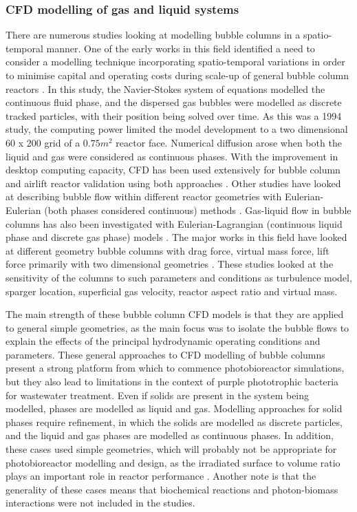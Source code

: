 \subsubsection{CFD modelling of gas and liquid systems}
There are numerous studies looking at modelling bubble columns in a spatio-temporal manner. One of the early works in this field identified a need to consider a modelling technique incorporating spatio-temporal variations in order to minimise capital and operating costs during scale-up of general bubble column reactors \cite{lapin1994}. In this study, the Navier-Stokes system of equations modelled the continuous fluid phase, and the dispersed gas bubbles were modelled as discrete tracked particles, with their position being solved over time. As this was a 1994 study, the computing power limited the model development to a two dimensional 60 x 200 grid of a $0.75 m^{2}$ reactor face. Numerical diffusion arose when both the liquid and gas were considered as continuous phases. With the improvement in desktop computing capacity, CFD has been used extensively for bubble column and airlift reactor validation using both approaches \cite{bitog2011}. Other studies have looked at describing bubble flow within different reactor geometries with Eulerian-Eulerian (both phases considered continuous) methods \cite{lehr2002, pfleger2001, buwa2002, pareek2003, ekambara2005, sokolichin1999}. Gas-liquid flow in bubble columns has also been investigated with Eulerian-Lagrangian (continuous liquid phase and discrete gas phase) models \cite{zhang2013a}. The major works in this field have looked at different geometry bubble columns with drag force, virtual mass force, lift force primarily with two dimensional geometries \cite{buwa2006, goz2004, luo2011, ekambara2005, mouza2004}. These studies looked at the sensitivity of the columns to such parameters and conditions as turbulence model, sparger location, superficial gas velocity, reactor aspect ratio and virtual mass.
\skippingparagraph

The main strength of these bubble column CFD models is that they are applied to general simple geometries, as the main focus was to isolate the bubble flows to explain the effects of the principal hydrodynamic operating conditions and parameters. These general approaches to CFD modelling of bubble columns present a strong platform from which to commence photobioreactor simulations, but they also lead to limitations in the context of purple phototrophic bacteria for wastewater treatment. Even if solids are present in the system being modelled, phases are modelled as liquid and gas. Modelling approaches for solid phases require refinement, in which the solids are modelled as discrete particles, and the liquid and gas phases are modelled as continuous phases. In addition, these cases used simple geometries, which will probably not be appropriate for photobioreactor modelling and design, as the irradiated surface to volume ratio plays an important role in reactor performance \cite{soman2015}. Another note is that the generality of these cases means that biochemical reactions and photon-biomass interactions were not included in the studies. 


